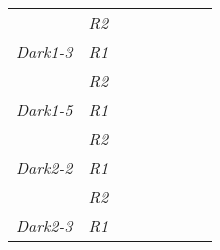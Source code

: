 \begin{table}[h]
\begin{tabular}{@{}|l|l|llllll@{}}
                     & \textit{R2}          &                                         &                                        &                                         &                                             &                       &                                          \\ \cmidrule(r){1-2}
\textit{Dark1-3}     & \textit{R1}          &                                         &                                        &                                         & \multicolumn{1}{l|}{}                       & \multicolumn{1}{l|}{} &                                          \\ \cmidrule(lr){2-2}
                     & \textit{R2}          &                                         &                                        &                                         &                                             &                       &                                          \\ \cmidrule(r){1-2}
\textit{Dark1-5}     & \textit{R1}          &                                         &                                        &                                         & \multicolumn{1}{l|}{}                       & \multicolumn{1}{l|}{} &                                          \\ \cmidrule(lr){2-2}
                     & \textit{R2}          &                                         &                                        &                                         &                                             &                       &                                          \\ \cmidrule(r){1-2}
\textit{Dark2-2}     & \textit{R1}          &                                         &                                        &                                         & \multicolumn{1}{l|}{}                       & \multicolumn{1}{l|}{} &                                          \\ \cmidrule(lr){2-2}
                     & \textit{R2}          &                                         &                                        &                                         &                                             &                       &                                          \\ \cmidrule(r){1-2}
\textit{Dark2-3}     & \textit{R1}          &                                         &                                        &                                         & \multicolumn{1}{l|}{}                       & \multicolumn{1}{l|}{} &                                          \\ \cmidrule(lr){2-2}

\end{tabular}
\end{table}
